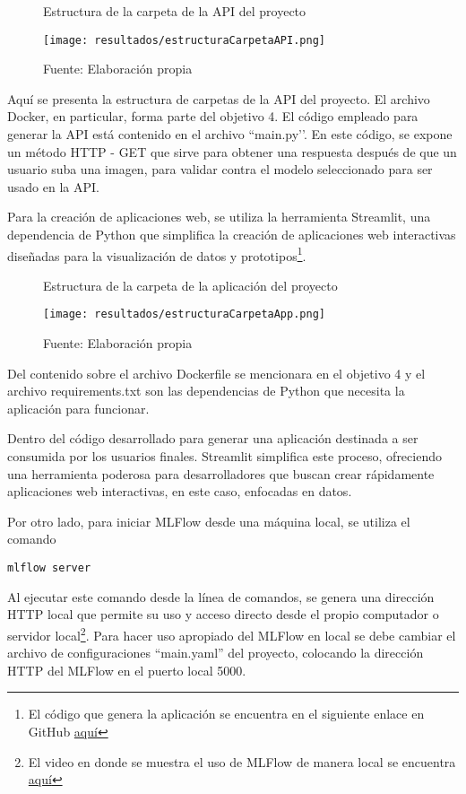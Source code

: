 \begin{figure}[h]
\centering
\caption{Estructura de la carpeta de la API del proyecto}
\texttt{[image: resultados/estructuraCarpetaAPI.png]}
\caption*{\footnotesize Fuente: Elaboración propia}
\label{fig:figuraEstructuraCarpetaAPI}
\end{figure}

Aquí se presenta la estructura de carpetas de la API del proyecto. El archivo Docker, en particular, forma parte del objetivo 4. El código empleado para generar la API está contenido en el archivo ``main.py’’. En este código, se expone un método HTTP - GET que sirve para obtener una respuesta después de que un usuario suba una imagen, para validar contra el modelo seleccionado para ser usado en la API.

Para la creación de aplicaciones web, se utiliza la herramienta Streamlit, una dependencia de Python que simplifica la creación de aplicaciones web interactivas diseñadas para la visualización de datos y prototipos\footnote{El código que genera la aplicación se encuentra en el siguiente enlace en GitHub \href{https://github.com/juferoto/mlops_project/tree/master/application/src/webapp}{aquí}}.

\newpage

\begin{figure}[h]
\centering
\caption{Estructura de la carpeta de la aplicación del proyecto}
\texttt{[image: resultados/estructuraCarpetaApp.png]}
\caption*{\footnotesize Fuente: Elaboración propia}
\label{fig:figuraEstructuraCarpetaApp}
\end{figure}

Del contenido sobre el archivo Dockerfile se mencionara en el objetivo 4 y el archivo requirements.txt son las dependencias de Python que necesita la aplicación para funcionar.

Dentro del código desarrollado para generar una aplicación destinada a ser consumida por los usuarios finales. Streamlit simplifica este proceso, ofreciendo una herramienta poderosa para desarrolladores que buscan crear rápidamente aplicaciones web interactivas, en este caso, enfocadas en datos. \newline

Por otro lado, para iniciar MLFlow desde una máquina local, se utiliza el comando 
\begin{verbatim}
mlflow server
\end{verbatim}

Al ejecutar este comando desde la línea de comandos, se genera una dirección HTTP local que permite su uso y acceso directo desde el propio computador o servidor local\footnote{El video en donde se muestra el uso de MLFlow de manera local se encuentra \href{https://youtu.be/w4WX-OeOkrQ}{aquí}}.
Para hacer uso apropiado del MLFlow en local se debe cambiar el archivo de configuraciones ``main.yaml'' del proyecto, colocando la dirección HTTP del MLFlow en el puerto local 5000.

